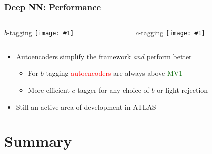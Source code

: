 \documentclass[usenames,dvipsnames]{beamer}
\newcommand{\widegraphic}[1]{\texttt{[image: \#1]}}
\begin{document}
\begin{frame}
  \frametitle{Deep NN: Performance}
  \begin{columns}
    \begin{column}{0.5\textwidth}
      \begin{center}
        $b$-tagging
       \widegraphic{%
figures/external/uRejRoc.pdf}
      \end{center}
    \end{column}
    \begin{column}{0.5\textwidth}
      \begin{center}
        $c$-tagging
      \widegraphic{figures/external/ctag-2d-gaia-vs-jfc.pdf}
      \end{center}
    \end{column}
  \end{columns}
  \begin{itemize}
  \item Autoencoders simplify the framework \emph{and} perform better
    \begin{itemize}
    \item For $b$-tagging \textcolor{red}{autoencoders} are always above \textcolor{darkgreen}{MV1}
    \item More efficient $c$-tagger for any choice of $b$ or light rejection
    \end{itemize}
  \item Still an active area of development in ATLAS
  \end{itemize}
\end{frame}


\section{Summary}
\end{document}
